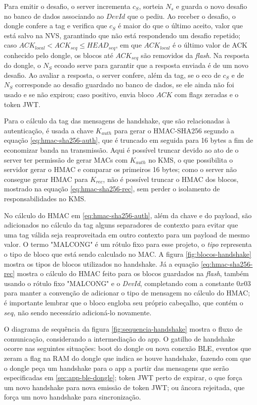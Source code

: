 \documentclass[
	12pt,
	article,			%
	oneside,
	a4paper,
	english,
	brazil				%
	]{abntex2}
\begin{document}
Para emitir o desafio, o server incrementa $c_S$, sorteia $N_s$ e guarda o novo desafio no banco de dados associando ao $DevId$ que o pediu.
Ao receber o desafio, o dongle confere a tag e verifica que $c_S$ é maior do que o último aceito, valor que está salvo na NVS, garantindo que
não está respondendo um desafio repetido; caso $ACK_{local} < ACK_{seq} \leq HEAD_{seq}$, em que $ACK_{local}$ é o último valor de ACK conhecido pelo dongle, os blocos até $ACK_{seq}$ são removidos da 
\textit{flash}. Na resposta do dongle, o $N_S$ ecoado serve para garantir que a resposta enviada é de um novo desafio. Ao avaliar a resposta, o 
server confere, além da tag, se o eco de $c_S$ e de $N_S$ corresponde ao desafio guardado no banco de dados, se ele ainda não foi usado e se não expirou; caso positivo, envia bloco $ACK$ com flags zeradas e o token JWT.

Para o cálculo da tag das mensagens de handshake, que são relacionadas à autenticação, é usada a chave $K_{auth}$ para gerar o HMAC-SHA256 segundo a 
equação \ref{eq:hmac-sha256-auth}, que é truncado em seguida para 16 bytes a fim de economizar banda na transmissão. Aqui é possível truncar devido ao 
ato de o server ter permissão de gerar MACs com $K_{auth}$ no KMS, o que possibilita o servidor gerar o HMAC e comparar os primeiros 16 bytes; como o server 
não consegue gerar HMAC para $K_{rec}$, não é possível truncar o HMAC dos blocos, mostrado na equação \ref{eq:hmac-sha256-rec}, sem perder o isolamento de 
responsabilidades no KMS.

No cálculo do HMAC em \ref{eq:hmac-sha256-auth}, além da chave e do payload, são adicionados no cálculo da tag alguns separadores de contexto para evitar
que uma tag válida seja reaproveitada em outro contexto para um payload de mesmo valor. O termo "MALCONG" é um rótulo fixo para esse projeto, 
o \textit{tipo} representa o tipo de bloco que está sendo calculado no MAC. A figura \ref{fig:blocos-handshake} mostra os tipos de blocos utilizados no handshake.
Já a equação \ref{eq:hmac-sha256-rec} mostra o cálculo do HMAC feito para os blocos guardados na \textit{flash}, também usando o rótulo fixo "MALCONG" e o \textit{DevId},
completando com a constante $0x03$ para manter a convenção de adicionar o tipo de mensagem no cálculo do HMAC; é importante lembrar que o bloco engloba seu próprio cabeçalho,
que contém o $seq$, não sendo necessário adicioná-lo novamente.

O diagrama de sequência da figura \ref{fig:sequencia-handshake} mostra o fluxo de comunicação, considerando a intermediação do app. O gatilho de handshake ocorre nas seguintes
situações: boot do dongle ou nova conexão BLE, eventos que zeram a flag na RAM do dongle que indica se houve handshake, fazendo com que o dongle peça um handshake para o app
a partir das mensagens que serão especificadas em \ref{sec:app-ble-dongle}; token JWT perto de expirar, o que força um novo handshake para nova emissão de token JWT; ou âncora rejeitada,
que força um novo handshake para sincronização.
\end{document}

